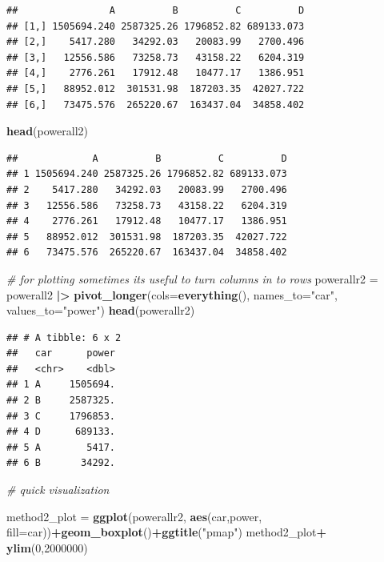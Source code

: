 \documentclass[
]{article}
\newenvironment{Shaded}{\begin{snugshade}}{\end{snugshade}}
\newcommand{\AttributeTok}[1]{\textcolor[rgb]{0.13,0.29,0.53}{#1}}
\newcommand{\CommentTok}[1]{\textcolor[rgb]{0.56,0.35,0.01}{\textit{#1}}}
\newcommand{\DecValTok}[1]{\textcolor[rgb]{0.00,0.00,0.81}{#1}}
\newcommand{\FunctionTok}[1]{\textcolor[rgb]{0.13,0.29,0.53}{\textbf{#1}}}
\newcommand{\NormalTok}[1]{#1}
\newcommand{\OtherTok}[1]{\textcolor[rgb]{0.56,0.35,0.01}{#1}}
\newcommand{\SpecialCharTok}[1]{\textcolor[rgb]{0.81,0.36,0.00}{\textbf{#1}}}
\newcommand{\StringTok}[1]{\textcolor[rgb]{0.31,0.60,0.02}{#1}}
\begin{document}
\begin{verbatim}
##                A          B          C          D
## [1,] 1505694.240 2587325.26 1796852.82 689133.073
## [2,]    5417.280   34292.03   20083.99   2700.496
## [3,]   12556.586   73258.73   43158.22   6204.319
## [4,]    2776.261   17912.48   10477.17   1386.951
## [5,]   88952.012  301531.98  187203.35  42027.722
## [6,]   73475.576  265220.67  163437.04  34858.402
\end{verbatim}

\begin{Shaded}
\begin{Highlighting}[]
\FunctionTok{head}\NormalTok{(powerall2)}
\end{Highlighting}
\end{Shaded}

\begin{verbatim}
##             A          B          C          D
## 1 1505694.240 2587325.26 1796852.82 689133.073
## 2    5417.280   34292.03   20083.99   2700.496
## 3   12556.586   73258.73   43158.22   6204.319
## 4    2776.261   17912.48   10477.17   1386.951
## 5   88952.012  301531.98  187203.35  42027.722
## 6   73475.576  265220.67  163437.04  34858.402
\end{verbatim}

\begin{Shaded}
\begin{Highlighting}[]
\CommentTok{\# for plotting sometimes its useful to turn columns in to rows}
\NormalTok{powerallr2 }\OtherTok{=}\NormalTok{ powerall2 }\SpecialCharTok{|\textgreater{}} \FunctionTok{pivot\_longer}\NormalTok{(}\AttributeTok{cols=}\FunctionTok{everything}\NormalTok{(), }\AttributeTok{names\_to=}\StringTok{"car"}\NormalTok{, }\AttributeTok{values\_to=}\StringTok{"power"}\NormalTok{)}
\FunctionTok{head}\NormalTok{(powerallr2)}
\end{Highlighting}
\end{Shaded}

\begin{verbatim}
## # A tibble: 6 x 2
##   car      power
##   <chr>    <dbl>
## 1 A     1505694.
## 2 B     2587325.
## 3 C     1796853.
## 4 D      689133.
## 5 A        5417.
## 6 B       34292.
\end{verbatim}

\begin{Shaded}
\begin{Highlighting}[]
\CommentTok{\# quick visualization}

\NormalTok{method2\_plot }\OtherTok{=} \FunctionTok{ggplot}\NormalTok{(powerallr2, }\FunctionTok{aes}\NormalTok{(car,power, }\AttributeTok{fill=}\NormalTok{car))}\SpecialCharTok{+}\FunctionTok{geom\_boxplot}\NormalTok{()}\SpecialCharTok{+}\FunctionTok{ggtitle}\NormalTok{(}\StringTok{"pmap"}\NormalTok{)}
\NormalTok{method2\_plot}\SpecialCharTok{+}
  \FunctionTok{ylim}\NormalTok{(}\DecValTok{0}\NormalTok{,}\DecValTok{2000000}\NormalTok{)}
\end{Highlighting}
\end{Shaded}
\end{document}
